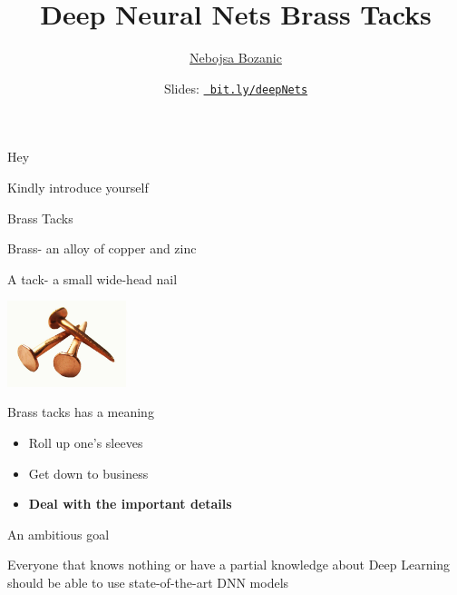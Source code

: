 \documentclass[12pt,t]{beamer}
\date{}
\title{Deep Neural Nets Brass Tacks}
\author{\href{http://xyz}{Nebojsa Bozanic}}
\date{
\scriptsize {\lolit Slides:} \href{http://bit.ly/deepNets}{\tt \scriptsize
  \color{foreground} bit.ly/deepNets}
 }
\begin{document}
{
\frame{
  \titlepage
  
} }




\begin{frame}[c]{Hey}

Kindly introduce yourself

\end{frame}

\begin{frame}[c]{Brass Tacks}

Brass\pause - an alloy of copper and zinc
\pause

A tack\pause - a small wide-head nail 
\pause

\includegraphics[height=25mm]{Figs/tacks.jpg}
\pause

Brass tacks has a meaning 
\pause
\begin{itemize}
\item Roll up one's sleeves
\pause
\item Get down to business 
\pause
\item \textbf{Deal with the important details}
\end{itemize}

\end{frame}

\begin{frame}[c]{An ambitious goal}


\pause
Everyone that knows nothing or have a partial knowledge about Deep Learning should be able to use state-of-the-art DNN models

\end{frame}
\end{document}
